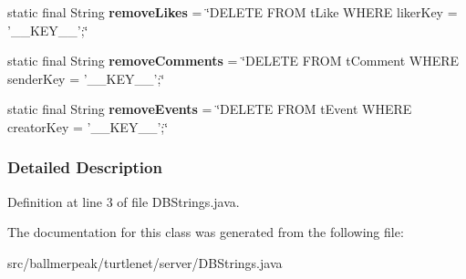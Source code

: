 \begin{DoxyCompactItemize}
\item 
\hypertarget{classballmerpeak_1_1turtlenet_1_1server_1_1DBStrings_a93fcbcf4eaf96862a3db95dec6b1fbcb}{static final String {\bfseries remove\-Likes} = \char`\"{}D\-E\-L\-E\-T\-E F\-R\-O\-M t\-Like W\-H\-E\-R\-E liker\-Key = '\-\_\-\-\_\-\-K\-E\-Y\-\_\-\-\_\-';\char`\"{}}\label{classballmerpeak_1_1turtlenet_1_1server_1_1DBStrings_a93fcbcf4eaf96862a3db95dec6b1fbcb}

\item 
\hypertarget{classballmerpeak_1_1turtlenet_1_1server_1_1DBStrings_a54bb85c47ce1672a4adecc4104caa10e}{static final String {\bfseries remove\-Comments} = \char`\"{}D\-E\-L\-E\-T\-E F\-R\-O\-M t\-Comment W\-H\-E\-R\-E sender\-Key = '\-\_\-\-\_\-\-K\-E\-Y\-\_\-\-\_\-';\char`\"{}}\label{classballmerpeak_1_1turtlenet_1_1server_1_1DBStrings_a54bb85c47ce1672a4adecc4104caa10e}

\item 
\hypertarget{classballmerpeak_1_1turtlenet_1_1server_1_1DBStrings_a107f35f84bfad780727aa44465cf9c59}{static final String {\bfseries remove\-Events} = \char`\"{}D\-E\-L\-E\-T\-E F\-R\-O\-M t\-Event W\-H\-E\-R\-E creator\-Key = '\-\_\-\-\_\-\-K\-E\-Y\-\_\-\-\_\-';\char`\"{}}\label{classballmerpeak_1_1turtlenet_1_1server_1_1DBStrings_a107f35f84bfad780727aa44465cf9c59}

\end{DoxyCompactItemize}


\subsubsection{Detailed Description}


Definition at line 3 of file D\-B\-Strings.\-java.



The documentation for this class was generated from the following file\-:\begin{DoxyCompactItemize}
\item 
src/ballmerpeak/turtlenet/server/D\-B\-Strings.\-java\end{DoxyCompactItemize}
